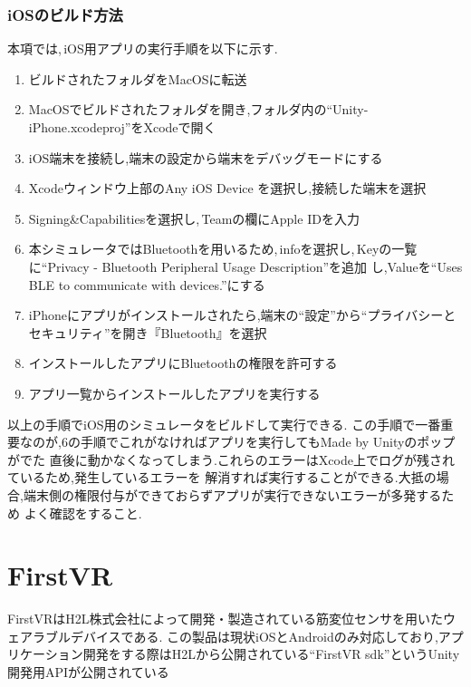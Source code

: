 \documentclass{ltjsreport}
\begin{document}
			\subsubsection{iOSのビルド方法}
				本項では,\,iOS用アプリの実行手順を以下に示す.
				\begin{enumerate}
					\item ビルドされたフォルダをMacOSに転送
					\item MacOSでビルドされたフォルダを開き,フォルダ内の``Unity-iPhone.xcodeproj''をXcodeで開く
					\item iOS端末を接続し,端末の設定から端末をデバッグモードにする
					\item Xcodeウィンドウ上部のAny iOS Device を選択し,接続した端末を選択
					\item Signing\&Capabilitiesを選択し,\,Teamの欄にApple IDを入力
					\item 本シミュレータではBluetoothを用いるため,\,infoを選択し,\,Keyの一覧に``Privacy - Bluetooth Peripheral Usage Description''を追加
						し,Valueを``Uses BLE to communicate with devices.''にする
					\item iPhoneにアプリがインストールされたら,端末の``設定''から``プライバシーとセキュリティ''を開き『Bluetooth』を選択
					\item インストールしたアプリにBluetoothの権限を許可する
					\item アプリ一覧からインストールしたアプリを実行する
				\end{enumerate}
				以上の手順でiOS用のシミュレータをビルドして実行できる.
				この手順で一番重要なのが,6の手順でこれがなければアプリを実行してもMade by Unityのポップがでた
				直後に動かなくなってしまう.これらのエラーはXcode上でログが残されているため,発生しているエラーを
				解消すれば実行することができる.大抵の場合,端末側の権限付与ができておらずアプリが実行できないエラーが多発するため
				よく確認をすること.
	\section{FirstVR}
		FirstVRはH2L株式会社\cite{ref:5}によって開発・製造されている筋変位センサを用いたウェアラブルデバイスである.
		この製品は現状iOSとAndroidのみ対応しており,アプリケーション開発をする際はH2Lから公開されている``FirstVR sdk''というUnity開発用APIが公開されている
\end{document}
